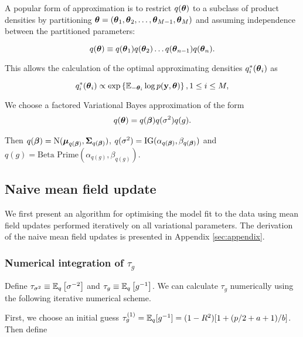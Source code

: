 \documentclass{amsart}[12pt]
\begin{document}
A popular form of approximation is to restrict $q({\boldsymbol \theta})$ to a subclass of product densities by partitioning
${\boldsymbol \theta} = ({\boldsymbol \theta}_1, {\boldsymbol \theta}_2, \ldots, {\boldsymbol \theta}_{M-1}, {\boldsymbol \theta}_M)$ and assuming independence between the
partitioned parameters:

\begin{equation*}
	q({\boldsymbol \theta}) \equiv q({\boldsymbol \theta}_1) q({\boldsymbol \theta}_2) \ldots q({\boldsymbol \theta}_{n-1}) q({\boldsymbol \theta}_n).
\end{equation*}

This allows the calculation of the optimal approximating densities $q_i^*({\boldsymbol \theta}_i)$ as

\begin{equation*}
	q_i^*({\boldsymbol \theta}_i) \propto \exp \left \{ \mathbb{E}_{-{\boldsymbol \theta}_i} \log p({\bf y}, {\boldsymbol \theta}) \right \}, 1 \leq i \leq M,
\end{equation*}

We choose a factored Variational Bayes approximation of the form
\begin{align*}
	q({\boldsymbol \theta}) = q({\boldsymbol \beta}) q(\sigma^2) q(g). 
\end{align*}

Then $q({\boldsymbol \beta}) = \text{N}({\boldsymbol \mu}_{q({\boldsymbol \beta})}, {\boldsymbol \Sigma}_{q({\boldsymbol \beta})})$, $q(\sigma^2) = \text{IG}(\alpha_{q({\boldsymbol \beta})}, \beta_{q({\boldsymbol \beta})})$ and $q(g) = \text{Beta Prime}(\alpha_{q(g)}, \beta_{q(g)})$.

\subsection{Naive mean field update}
\label{sec:naive_mean_field_updates}

We first present an algorithm for optimising the model fit to the data using mean field updates performed
iteratively on all variational parameters. The derivation of the naive mean field updates is presented in
Appendix \ref{sec:appendix}.

\subsubsection{Numerical integration of $\tau_g$}
\label{sec:num_int}

Define $\tau_{\sigma^2} \equiv \mathbb{E}_q \left[ \sigma^{-2} \right]$ and $\tau_g \equiv \mathbb{E}_q \left[ g^{-1}
\right]$. We can calculate $\tau_g$ numerically using the following iterative numerical scheme.

First, we choose an initial guess $\tau_g^{(1)} = \mathbb{E}_q [g^{-1}] = (1 - R^2) [1 + (p / 2 + a + 1)/b]$. Then
define
\end{document}
